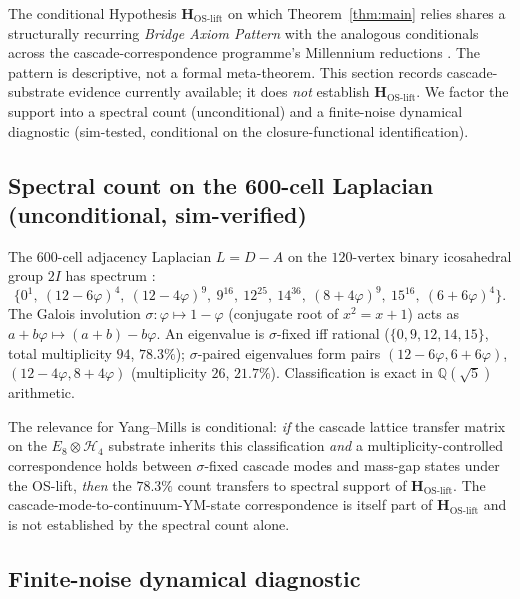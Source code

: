 \documentclass[11pt, a4paper]{amsart}
\theoremstyle{definition}
\newcommand{\Q}{\mathbb{Q}}
\newcommand{\HH}{\mathcal{H}}
\begin{document}
The conditional Hypothesis $\mathbf{H_{\mathrm{OS\text{-}lift}}}$
on which Theorem~\ref{thm:main} relies shares a structurally
recurring \emph{Bridge Axiom Pattern} with the analogous
conditionals across the cascade-correspondence programme's
Millennium reductions \cite{ConvergenceWithSmart, CascadeRHformal}.
The pattern is descriptive, not a formal meta-theorem.  This
section records cascade-substrate evidence currently available;
it does \emph{not} establish $\mathbf{H_{\mathrm{OS\text{-}lift}}}$.
We factor the support into a spectral count (unconditional) and a
finite-noise dynamical diagnostic (sim-tested, conditional on the
closure-functional identification).

\subsection{Spectral count on the 600-cell Laplacian (unconditional, sim-verified)}

The 600-cell adjacency Laplacian $L = D - A$ on the
$120$-vertex binary icosahedral group $2I$ has spectrum
\cite{CascadeAttractorSpectrum}:
\[
  \{0^{1},\ (12{-}6\varphi)^{4},\ (12{-}4\varphi)^{9},\ 9^{16},\
   12^{25},\ 14^{36},\ (8{+}4\varphi)^{9},\ 15^{16},\
   (6{+}6\varphi)^{4}\}.
\]
The Galois involution $\sigma: \varphi \mapsto 1-\varphi$
(conjugate root of $x^2 = x + 1$) acts as
$a + b\varphi \mapsto (a+b) - b\varphi$.  An eigenvalue is
$\sigma$-fixed iff rational ($\{0,9,12,14,15\}$, total multiplicity
$94$, $\bm{78.3\%}$); $\sigma$-paired eigenvalues form pairs
$(12{-}6\varphi, 6{+}6\varphi)$, $(12{-}4\varphi, 8{+}4\varphi)$
(multiplicity $26$, $\bm{21.7\%}$).  Classification is exact in
$\Q(\sqrt 5)$ arithmetic.

The relevance for Yang--Mills is conditional: \emph{if} the cascade
lattice transfer matrix on the $E_8 \otimes \HH_4$ substrate
inherits this classification \emph{and} a multiplicity-controlled
correspondence holds between $\sigma$-fixed cascade modes and
mass-gap states under the OS-lift, \emph{then} the $78.3\%$ count
transfers to spectral support of $\mathbf{H_{\mathrm{OS\text{-}lift}}}$.
The cascade-mode-to-continuum-YM-state correspondence is itself
part of $\mathbf{H_{\mathrm{OS\text{-}lift}}}$ and is not
established by the spectral count alone.

\subsection{Finite-noise dynamical diagnostic}
\end{document}

